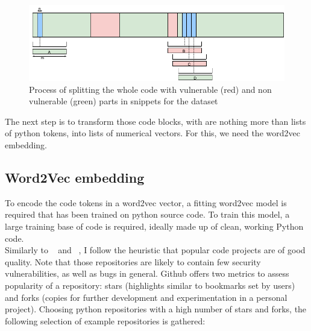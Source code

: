 \documentclass[
	a4paper,
	pagesize,
	pdftex,
	12pt,
	twoside, %
	BCOR=5mm, %
	ngerman,
	fleqn,
	final,
	]{scrartcl}
\begin{document}
\begin{figure}[ht]
	\centering
	\includegraphics[width=\linewidth]{img/FocusBlocks}
	\caption{Process of splitting the whole code with vulnerable (red) and non vulnerable (green) parts in snippets for the dataset}
	\label{fig:FocusBlocks}
\end{figure}

The next step is to transform those code blocks, with are nothing more than lists of python tokens, into lists of numerical vectors. For this, we need the word2vec embedding. 

\subsection{Word2Vec embedding}
To encode the code tokens in a word2vec vector, a fitting word2vec model is required that has been trained on python source code. To train this model, a large training base of code is required, ideally made up of clean, working Python code.\\
Similarly to ~\cite{Bhoopchand.2016} and ~\cite{Allamanis.2013}, I follow the  heuristic that popular code projects are of good quality. Note that those repositories are likely to contain few security vulnerabilities, as well as bugs in general. Github offers two metrics to assess popularity of a repository: stars (highlights similar to bookmarks set by users) and forks (copies for further development and experimentation in a personal project). Choosing python repositories with a high number of stars and forks, the following selection of example repositories is gathered:
\end{document}
